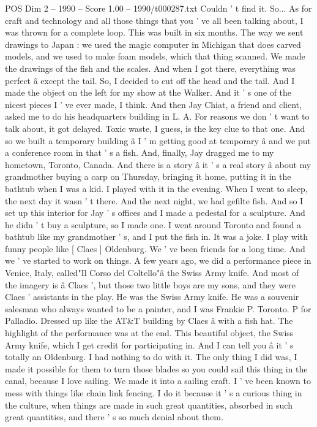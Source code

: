 \begin{textsample}{POS Dim 2 – 1990 – Score 1.00 – 1990/t000287.txt}
Couldn ' t find it.
So...
As for craft and technology and all those things that you ' ve all been talking about, I was thrown for a complete loop.
This was built in six months.
The way we sent drawings to Japan : we used the magic computer in Michigan that does carved models, and we used to make foam models, which that thing scanned.
We made the drawings of the fish and the scales.
And when I got there, everything was perfect â except the tail.
So, I decided to cut off the head and the tail.
And I made the object on the left for my show at the Walker.
And it ' s one of the nicest pieces I ' ve ever made, I think.
And then Jay Chiat, a friend and client, asked me to do his headquarters building in L.
A.
For reasons we don ' t want to talk about, it got delayed.
Toxic waste, I guess, is the key clue to that one.
And so we built a temporary building â I ' m getting good at temporary â and we put a conference room in that ' s a fish.
And, finally, Jay dragged me to my hometown, Toronto, Canada.
And there is a story â it ' s a real story â about my grandmother buying a carp on Thursday, bringing it home, putting it in the bathtub when I was a kid.
I played with it in the evening.
When I went to sleep, the next day it wasn ' t there.
And the next night, we had gefilte fish.
And so I set up this interior for Jay ' s offices and I made a pedestal for a sculpture.
And he didn ' t buy a sculpture, so I made one.
I went around Toronto and found a bathtub like my grandmother ' s, and I put the fish in.
It was a joke.
I play with funny people like [ Claes ] Oldenburg.
We ' ve been friends for a long time.
And we ' ve started to work on things.
A few years ago, we did a performance piece in Venice, Italy, called"Il Corso del Coltello"â the Swiss Army knife.
And most of the imagery is â Claes ', but those two little boys are my sons, and they were Claes ' assistants in the play.
He was the Swiss Army knife.
He was a souvenir salesman who always wanted to be a painter, and I was Frankie P.
Toronto.
P for Palladio.
Dressed up like the AT\&T building by Claes â with a fish hat.
The highlight of the performance was at the end.
This beautiful object, the Swiss Army knife, which I get credit for participating in.
And I can tell you â it ' s totally an Oldenburg.
I had nothing to do with it.
The only thing I did was, I made it possible for them to turn those blades so you could sail this thing in the canal, because I love sailing.
We made it into a sailing craft.
I ' ve been known to mess with things like chain link fencing.
I do it because it ' s a curious thing in the culture, when things are made in such great quantities, absorbed in such great quantities, and there ' s so much denial about them.

\end{textsample}
